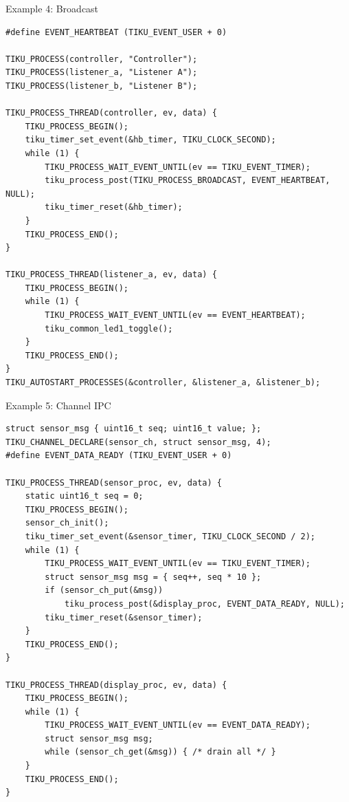 \documentclass[aspectratio=169, 10pt]{beamer}
\begin{document}
\begin{frame}[fragile]{Example 4: Broadcast}
\begin{lstlisting}[style=cstyle, title={examples/07\_broadcast/broadcast.c (simplified)}]
#define EVENT_HEARTBEAT (TIKU_EVENT_USER + 0)

TIKU_PROCESS(controller, "Controller");
TIKU_PROCESS(listener_a, "Listener A");
TIKU_PROCESS(listener_b, "Listener B");

TIKU_PROCESS_THREAD(controller, ev, data) {
    TIKU_PROCESS_BEGIN();
    tiku_timer_set_event(&hb_timer, TIKU_CLOCK_SECOND);
    while (1) {
        TIKU_PROCESS_WAIT_EVENT_UNTIL(ev == TIKU_EVENT_TIMER);
        tiku_process_post(TIKU_PROCESS_BROADCAST, EVENT_HEARTBEAT, NULL);
        tiku_timer_reset(&hb_timer);
    }
    TIKU_PROCESS_END();
}

TIKU_PROCESS_THREAD(listener_a, ev, data) {
    TIKU_PROCESS_BEGIN();
    while (1) {
        TIKU_PROCESS_WAIT_EVENT_UNTIL(ev == EVENT_HEARTBEAT);
        tiku_common_led1_toggle();
    }
    TIKU_PROCESS_END();
}
TIKU_AUTOSTART_PROCESSES(&controller, &listener_a, &listener_b);
\end{lstlisting}
\end{frame}

\begin{frame}[fragile]{Example 5: Channel IPC}
\begin{lstlisting}[style=cstyle, title={examples/09\_channel/channel.c (simplified)}]
struct sensor_msg { uint16_t seq; uint16_t value; };
TIKU_CHANNEL_DECLARE(sensor_ch, struct sensor_msg, 4);
#define EVENT_DATA_READY (TIKU_EVENT_USER + 0)

TIKU_PROCESS_THREAD(sensor_proc, ev, data) {
    static uint16_t seq = 0;
    TIKU_PROCESS_BEGIN();
    sensor_ch_init();
    tiku_timer_set_event(&sensor_timer, TIKU_CLOCK_SECOND / 2);
    while (1) {
        TIKU_PROCESS_WAIT_EVENT_UNTIL(ev == TIKU_EVENT_TIMER);
        struct sensor_msg msg = { seq++, seq * 10 };
        if (sensor_ch_put(&msg))
            tiku_process_post(&display_proc, EVENT_DATA_READY, NULL);
        tiku_timer_reset(&sensor_timer);
    }
    TIKU_PROCESS_END();
}

TIKU_PROCESS_THREAD(display_proc, ev, data) {
    TIKU_PROCESS_BEGIN();
    while (1) {
        TIKU_PROCESS_WAIT_EVENT_UNTIL(ev == EVENT_DATA_READY);
        struct sensor_msg msg;
        while (sensor_ch_get(&msg)) { /* drain all */ }
    }
    TIKU_PROCESS_END();
}
\end{lstlisting}
\end{frame}
\end{document}
